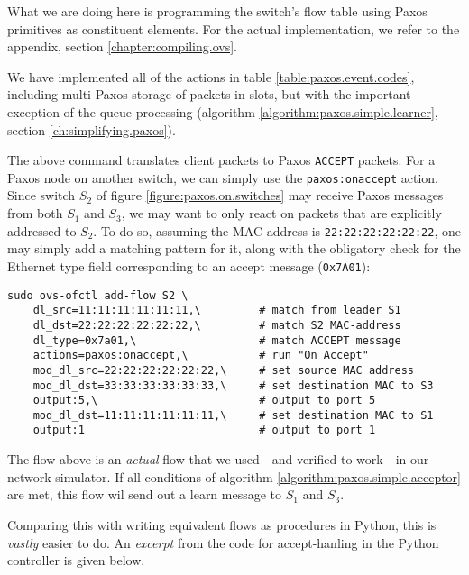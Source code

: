 What we are doing here is programming the switch's flow table using Paxos
primitives as constituent elements.  For the actual implementation, we refer
to the appendix, section \vref{chapter:compiling.ovs}.

We have implemented all of the actions in table
\ref{table:paxos.event.codes}, including multi-Paxos storage of packets in
slots, but with the important exception of the queue processing (algorithm
\ref{algorithm:paxos.simple.learner}, section
\ref{ch:simplifying.paxos}).

The above command translates client packets to Paxos \texttt{ACCEPT}
packets.  For a Paxos node on another switch, we can simply use the
\texttt{paxos:onaccept} action.  Since switch $S_2$ of figure
\vref{figure:paxos.on.switches} may receive Paxos messages from both $S_1$
and $S_3$, we may want to only react on packets that are explicitly
addressed to $S_2$.
%
To do so, assuming the MAC-address is \texttt{22:22:22:22:22:22}, one may
simply add a matching pattern for it, along with the obligatory check for
the Ethernet type field corresponding to an accept message
(\texttt{0x7A01}):

\begin{Verbatim}
sudo ovs-ofctl add-flow S2 \
    dl_src=11:11:11:11:11:11,\         # match from leader S1
    dl_dst=22:22:22:22:22:22,\         # match S2 MAC-address
    dl_type=0x7a01,\                   # match ACCEPT message
    actions=paxos:onaccept,\           # run "On Accept"
    mod_dl_src=22:22:22:22:22:22,\     # set source MAC address
    mod_dl_dst=33:33:33:33:33:33,\     # set destination MAC to S3
    output:5,\                         # output to port 5
    mod_dl_dst=11:11:11:11:11:11,\     # set destination MAC to S1
    output:1                           # output to port 1
\end{Verbatim}

The flow above is an \textit{actual} flow that we used---and verified to
work---in our network simulator.  If all conditions of algorithm
\ref{algorithm:paxos.simple.acceptor} are met, this flow wil send out a
learn message to $S_1$ and $S_3$.

Comparing this with writing equivalent flows as procedures in Python, this
is \textit{vastly} easier to do.  An \textit{excerpt} from the code for
accept-hanling in the Python controller is given below.

